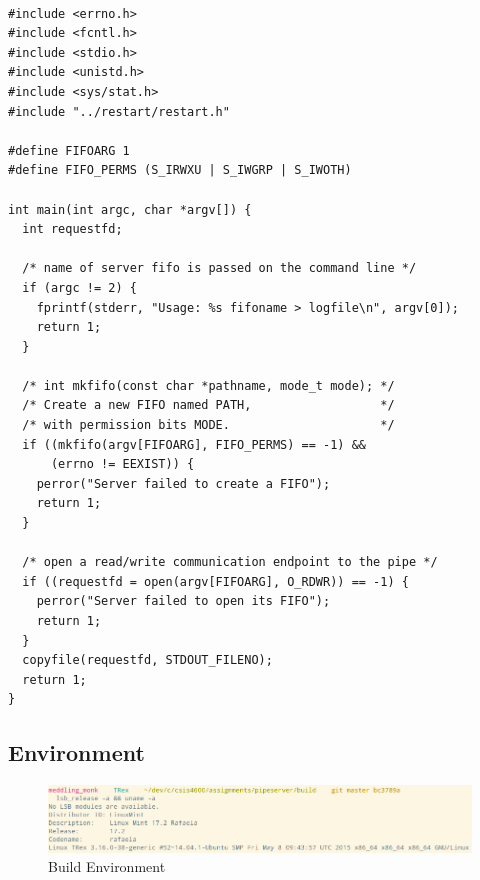\documentclass[letter,12pt,sffamily]{article}
\begin{document}
\begin{verbatim}

#include <errno.h>
#include <fcntl.h>
#include <stdio.h>
#include <unistd.h>
#include <sys/stat.h>
#include "../restart/restart.h"

#define FIFOARG 1
#define FIFO_PERMS (S_IRWXU | S_IWGRP | S_IWOTH)

int main(int argc, char *argv[]) {
  int requestfd;

  /* name of server fifo is passed on the command line */
  if (argc != 2) { 
    fprintf(stderr, "Usage: %s fifoname > logfile\n", argv[0]);
    return 1;
  }
	
  /* int mkfifo(const char *pathname, mode_t mode); */
  /* Create a new FIFO named PATH,                  */ 
  /* with permission bits MODE.                     */
  if ((mkfifo(argv[FIFOARG], FIFO_PERMS) == -1) && 
      (errno != EEXIST)) {
    perror("Server failed to create a FIFO");
    return 1;
  }
	
  /* open a read/write communication endpoint to the pipe */
  if ((requestfd = open(argv[FIFOARG], O_RDWR)) == -1) {
    perror("Server failed to open its FIFO");
    return 1;
  }
  copyfile(requestfd, STDOUT_FILENO);
  return 1;
}
\end{verbatim}
\subsection{Environment}
\begin{figure}[H]
	\centering
	\includegraphics[width=1\linewidth]{./images/0}
	\caption[env]{Build Environment}
	\label{fig:0}
\end{figure}
\end{document}
